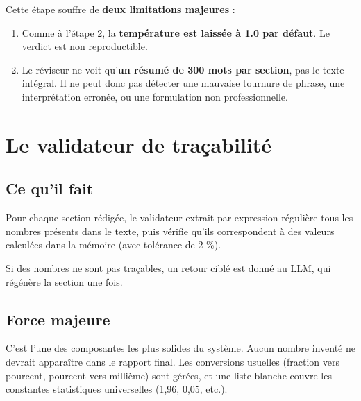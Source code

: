 \documentclass[12pt,a4paper]{article}
\begin{document}
\begin{blockerbox}
Cette étape souffre de \textbf{deux limitations majeures} :

\begin{enumerate}[leftmargin=1.5em, itemsep=0pt]
  \item Comme à l'étape 2, la \textbf{température est laissée à 1.0 par défaut}.
        Le verdict est non reproductible.
  \item Le réviseur ne voit qu'\textbf{un résumé de 300 mots par section}, pas
        le texte intégral. Il ne peut donc pas détecter une mauvaise tournure de
        phrase, une interprétation erronée, ou une formulation non professionnelle.
\end{enumerate}
\end{blockerbox}

\newpage

\section{Le validateur de traçabilité}

\subsection{Ce qu'il fait}

Pour chaque section rédigée, le validateur extrait par expression régulière
tous les nombres présents dans le texte, puis vérifie qu'ils correspondent
à des valeurs calculées dans la mémoire (avec tolérance de 2 \%).

Si des nombres ne sont pas traçables, un retour ciblé est donné au LLM,
qui régénère la section une fois.

\subsection{Force majeure}

\begin{forcebox}
C'est l'une des composantes les plus solides du système. Aucun nombre inventé
ne devrait apparaître dans le rapport final. Les conversions usuelles
(fraction vers pourcent, pourcent vers millième) sont gérées, et une liste
blanche couvre les constantes statistiques universelles (1{,}96, 0{,}05, etc.).
\end{forcebox}
\end{document}

